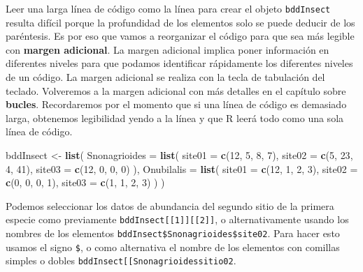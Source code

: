 \documentclass[]{book}
\makeatletter
\newenvironment{Shaded}{\begin{snugshade}}{\end{snugshade}}
\newcommand{\KeywordTok}[1]{\textcolor[rgb]{0.13,0.29,0.53}{\textbf{#1}}}
\newcommand{\DataTypeTok}[1]{\textcolor[rgb]{0.13,0.29,0.53}{#1}}
\newcommand{\DecValTok}[1]{\textcolor[rgb]{0.00,0.00,0.81}{#1}}
\newcommand{\StringTok}[1]{\textcolor[rgb]{0.31,0.60,0.02}{#1}}
\newcommand{\NormalTok}[1]{#1}
\newenvironment{kframe}{%
\medskip{}
\setlength{\fboxsep}{.8em}
 \def\at@end@of@kframe{}%
 \ifinner\ifhmode%
  \def\at@end@of@kframe{\end{minipage}}%
  \begin{minipage}{\columnwidth}%
 \fi\fi%
 \def\FrameCommand##1{\hskip\@totalleftmargin \hskip-\fboxsep
 \colorbox{shadecolor}{##1}\hskip-\fboxsep
     \hskip-\linewidth \hskip-\@totalleftmargin \hskip\columnwidth}%
 \MakeFramed {\advance\hsize-\width
   \@totalleftmargin\z@ \linewidth\hsize
   \@setminipage}}%
 {\par\unskip\endMakeFramed%
 \at@end@of@kframe}
\newenvironment{rmdblock}[1]
  {
  \begin{itemize}
  \renewcommand{\labelitemi}{
    \raisebox{-.7\height}[0pt][0pt]{
      {\setkeys{Gin}{width=3em,keepaspectratio}\texttt{[image: myIcons/\#1]}} %
    }
  }
  \setlength{\fboxsep}{1em}
  \begin{kframe}
  \item
  }
  {
  \end{kframe}
  \end{itemize}
  }
\newenvironment{rmdstyle}     %
  {\begin{rmdblock}{style}}   %
  {\end{rmdblock}}            %
\makeatother
\begin{document}
\begin{rmdstyle}
Leer una larga línea de código como la línea para crear el objeto
\texttt{bddInsect} resulta difícil porque la profundidad de los
elementos solo se puede deducir de los paréntesis. Es por eso que vamos
a reorganizar el código para que sea más legible con \textbf{margen
adicional}. La margen adicional implica poner información en diferentes
niveles para que podamos identificar rápidamente los diferentes niveles
de un código. La margen adicional se realiza con la tecla de tabulación
del teclado. Volveremos a la margen adicional con más detalles en el
capítulo sobre \textbf{bucles}. Recordaremos por el momento que si una
línea de código es demasiado larga, obtenemos legibilidad yendo a la
línea y que R leerá todo como una sola línea de código.
\end{rmdstyle}

\begin{Shaded}
\begin{Highlighting}[]
\NormalTok{bddInsect <-}\StringTok{ }\KeywordTok{list}\NormalTok{(}
  \DataTypeTok{Snonagrioides =} \KeywordTok{list}\NormalTok{(}
    \DataTypeTok{site01 =} \KeywordTok{c}\NormalTok{(}\DecValTok{12}\NormalTok{, }\DecValTok{5}\NormalTok{, }\DecValTok{8}\NormalTok{, }\DecValTok{7}\NormalTok{), }
    \DataTypeTok{site02 =} \KeywordTok{c}\NormalTok{(}\DecValTok{5}\NormalTok{, }\DecValTok{23}\NormalTok{, }\DecValTok{4}\NormalTok{, }\DecValTok{41}\NormalTok{), }
    \DataTypeTok{site03 =} \KeywordTok{c}\NormalTok{(}\DecValTok{12}\NormalTok{, }\DecValTok{0}\NormalTok{, }\DecValTok{0}\NormalTok{, }\DecValTok{0}\NormalTok{)}
\NormalTok{  ), }
  \DataTypeTok{Onubilalis =} \KeywordTok{list}\NormalTok{(}
    \DataTypeTok{site01 =} \KeywordTok{c}\NormalTok{(}\DecValTok{12}\NormalTok{, }\DecValTok{1}\NormalTok{, }\DecValTok{2}\NormalTok{, }\DecValTok{3}\NormalTok{), }
    \DataTypeTok{site02 =} \KeywordTok{c}\NormalTok{(}\DecValTok{0}\NormalTok{, }\DecValTok{0}\NormalTok{, }\DecValTok{0}\NormalTok{, }\DecValTok{1}\NormalTok{), }
    \DataTypeTok{site03 =} \KeywordTok{c}\NormalTok{(}\DecValTok{1}\NormalTok{, }\DecValTok{1}\NormalTok{, }\DecValTok{2}\NormalTok{, }\DecValTok{3}\NormalTok{)}
\NormalTok{  )}
\NormalTok{)}
\end{Highlighting}
\end{Shaded}

Podemos seleccionar los datos de abundancia del segundo sitio de la
primera especie como previamente
\texttt{bddInsect{[}{[}1{]}{]}{[}{[}2{]}{]}}, o alternativamente usando
los nombres de los elementos \texttt{bddInsect\$Snonagrioides\$site02}.
Para hacer esto usamos el signo \texttt{\$}, o como alternativa el
nombre de los elementos con comillas simples o dobles
\texttt{bddInsect{[}{[}\textquotesingle{}Snonagrioides\textquotesingle{}{]}{]}{[}{[}\textquotesingle{}sitio02\textquotesingle{}{]}{]}}.
\end{document}

